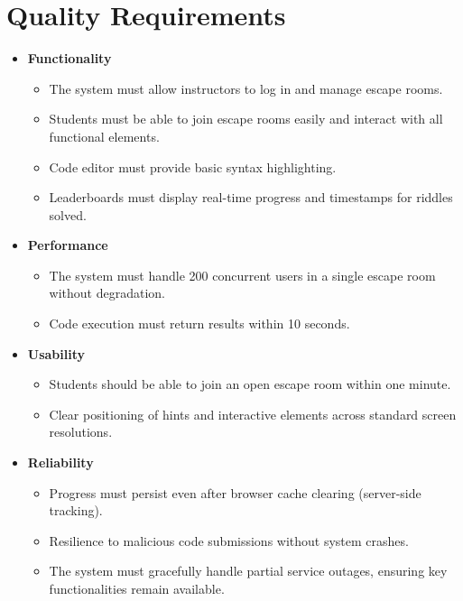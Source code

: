 \hypertarget{section-quality-scenarios}{%
\section{Quality Requirements}\label{section-quality-scenarios}}
\begin{itemize}
    \item \textbf{Functionality}
    \begin{itemize}
        \item The system must allow instructors to log in and manage escape rooms.
        \item Students must be able to join escape rooms easily and interact with all functional elements.
        \item Code editor must provide basic syntax highlighting.
        \item Leaderboards must display real-time progress and timestamps for riddles solved.
    \end{itemize}

    \item \textbf{Performance}
    \begin{itemize}
        \item The system must handle 200 concurrent users in a single escape room without degradation.
        \item Code execution must return results within 10 seconds.
    \end{itemize}

    \item \textbf{Usability}
    \begin{itemize}
        \item Students should be able to join an open escape room within one minute.
        \item Clear positioning of hints and interactive elements across standard screen resolutions.
    \end{itemize}

    \item \textbf{Reliability}
    \begin{itemize}
        \item Progress must persist even after browser cache clearing (server-side tracking).
        \item Resilience to malicious code submissions without system crashes.
        \item The system must gracefully handle partial service outages, ensuring key functionalities remain available.
    \end{itemize}


\end{itemize}
